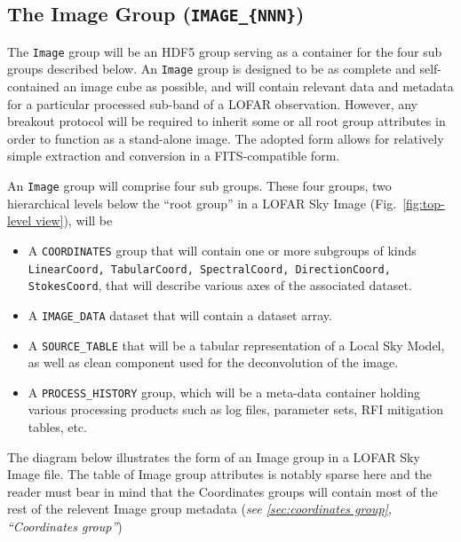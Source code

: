 \documentclass[a4paper,10pt,bibtotoc]{scrartcl}
\begin{document}




\subsection{The Image Group ({\tt IMAGE\_\{NNN\}})}
\label{sec:image group}

The \texttt{Image} group will be an HDF5 group serving as a container
for the four sub groups described below. An \texttt{Image} group is
designed to be as complete and self-contained an image cube as
possible, and will contain relevant data and metadata for a particular
processed sub-band of a LOFAR observation.  However, any breakout
protocol will be required to inherit some or all root group attributes
in order to function as a stand-alone image.  The adopted form allows
for relatively simple extraction and conversion in a FITS-compatible
form.

An \texttt{Image} group will comprise four sub groups. These four
groups, two hierarchical levels below the ``root group'' in a LOFAR Sky
Image (Fig.~\ref{fig:top-level view}), will be

\begin{itemize}
\item A \verb|COORDINATES| group that will contain one or more
  subgroups of kinds \texttt{LinearCoord, TabularCoord, SpectralCoord,
    DirectionCoord, StokesCoord}, that will describe various axes of
  the associated dataset.
\item A \verb|IMAGE_DATA| dataset that will contain a dataset array.
\item A \verb|SOURCE_TABLE| that will be a tabular representation of a
  Local Sky Model, as well as clean component used for the
  deconvolution of the image.
\item A \verb|PROCESS_HISTORY| group, which will be a meta-data container
  holding various processing products such as log files, parameter sets, RFI
  mitigation tables, etc.
\end{itemize}

The diagram below illustrates the form of an Image group in a LOFAR
Sky Image file.  The table of Image group attributes is notably sparse
here and the reader must bear in mind that the Coordinates groups will
contain most of the rest of the relevent Image group metadata
(\textit{see \ref{sec:coordinates group}, ``Coordinates group''})
\end{document}

